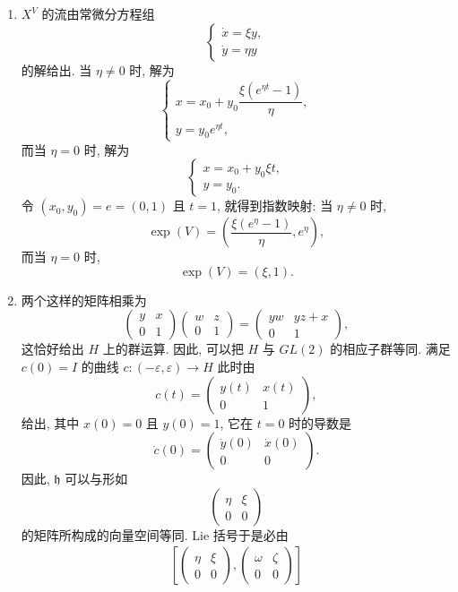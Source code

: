 \begin{description}[font=\normalfont,leftmargin=2em,labelwidth=1.5em]
\begin{enumerate}[label=(\alph*),ref=\alph*,leftmargin=*]
因此
\[
  [V,W]=[X^V,X^W]_{(0,1)}=(\eta\zeta-\omega\xi)\frac{\partial}{\partial x}.
\]
\item\label{sol:affine-group-exponential} $X^V$ 的流由常微分方程组
\[
  \begin{cases}
  \dot x=\xi y,\\
  \dot y=\eta y
  \end{cases}
\]
的解给出. 当 $\eta\ne0$ 时, 解为
\[
  \begin{cases}
  x=x_0+y_0\dfrac{\xi(e^{\eta t}-1)}{\eta},\\[2pt]
  y=y_0e^{\eta t},
  \end{cases}
\]
而当 $\eta=0$ 时, 解为
\[
  \begin{cases}
  x=x_0+y_0\xi t,\\
  y=y_0.
  \end{cases}
\]
令 $(x_0,y_0)=e=(0,1)$ 且 $t=1$, 就得到指数映射: 当 $\eta\ne0$ 时,
\[
  \exp(V)=\left(\frac{\xi(e^\eta-1)}{\eta},e^\eta\right),
\]
而当 $\eta=0$ 时,
\[
  \exp(V)=(\xi,1).
\]
\item 两个这样的矩阵相乘为
\[
  \begin{pmatrix}y&x\\0&1\end{pmatrix}\begin{pmatrix}w&z\\0&1\end{pmatrix}
  =\begin{pmatrix}yw&yz+x\\0&1\end{pmatrix},
\]
这恰好给出 $H$ 上的群运算. 因此, 可以把 $H$ 与 $GL(2)$ 的相应子群等同. 满足 $c(0)=I$ 的曲线 $c:(-\varepsilon,\varepsilon)\to H$ 此时由
\[
  c(t)=\begin{pmatrix}y(t)&x(t)\\0&1\end{pmatrix},
\]
给出, 其中 $x(0)=0$ 且 $y(0)=1$, 它在 $t=0$ 时的导数是
\[
  \dot c(0)=\begin{pmatrix}\dot y(0)&\dot x(0)\\0&0\end{pmatrix}.
\]
因此, $\mathfrak{h}$ 可以与形如
\[
  \begin{pmatrix}\eta&\xi\\0&0\end{pmatrix}
\]
的矩阵所构成的向量空间等同. Lie 括号于是必由
\begin{align*}
  \left[\begin{pmatrix}\eta&\xi\\0&0\end{pmatrix},\begin{pmatrix}\omega&\zeta\\0&0\end{pmatrix}\right]

\end{align*}
\end{enumerate}
\end{description}
